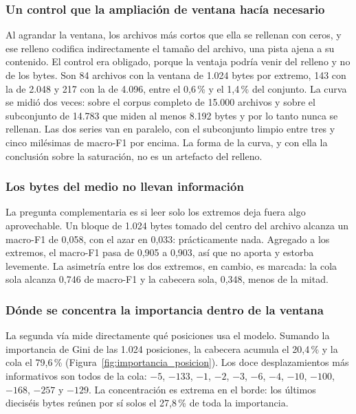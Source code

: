 \subsubsection*{Un control que la ampliación de ventana hacía necesario}

Al agrandar la ventana, los archivos más cortos que ella se rellenan con ceros, y ese relleno codifica indirectamente el tamaño del archivo, una pista ajena a su contenido. El control era obligado, porque la ventaja podría venir del relleno y no de los bytes. Son 84 archivos con la ventana de 1.024 bytes por extremo, 143 con la de 2.048 y 217 con la de 4.096, entre el 0,6\,\% y el 1,4\,\% del conjunto. La curva se midió dos veces: sobre el corpus completo de 15.000 archivos y sobre el subconjunto de 14.783 que miden al menos 8.192 bytes y por lo tanto nunca se rellenan. Las dos series van en paralelo, con el subconjunto limpio entre tres y cinco milésimas de macro-F1 por encima. La forma de la curva, y con ella la conclusión sobre la saturación, no es un artefacto del relleno.

\subsubsection*{Los bytes del medio no llevan información}

La pregunta complementaria es si leer solo los extremos deja fuera algo aprovechable. Un bloque de 1.024 bytes tomado del centro del archivo alcanza un macro-F1 de 0,058, con el azar en 0,033: prácticamente nada. Agregado a los extremos, el macro-F1 pasa de 0,905 a 0,903, así que no aporta y estorba levemente. La asimetría entre los dos extremos, en cambio, es marcada: la cola sola alcanza 0,746 de macro-F1 y la cabecera sola, 0,348, menos de la mitad.

\subsubsection*{Dónde se concentra la importancia dentro de la ventana}

La segunda vía mide directamente qué posiciones usa el modelo. Sumando la importancia de Gini de las 1.024 posiciones, la cabecera acumula el 20,4\,\% y la cola el 79,6\,\% (Figura~\ref{fig:importancia_posicion}). Los doce desplazamientos más informativos son todos de la cola: $-5$, $-133$, $-1$, $-2$, $-3$, $-6$, $-4$, $-10$, $-100$, $-168$, $-257$ y $-129$. La concentración es extrema en el borde: los últimos dieciséis bytes reúnen por sí solos el 27,8\,\% de toda la importancia.

